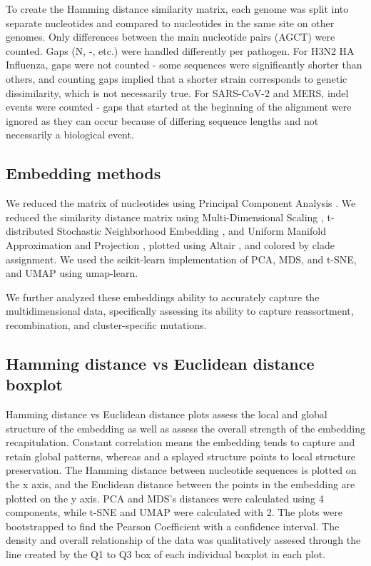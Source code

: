 \documentclass[10pt,letterpaper]{article}
\begin{document}
To create the Hamming distance similarity matrix, each genome was split into separate nucleotides and compared to nucleotides in the same site on other genomes.
Only differences between the main nucleotide pairs (AGCT) were counted.
Gaps (N, -, etc.) were handled differently per pathogen.
For H3N2 HA Influenza, gaps were not counted - some sequences were significantly shorter than others, and counting gaps implied that a shorter strain corresponds to genetic dissimilarity, which is not necessarily true.
For SARS-CoV-2 and MERS, indel events were counted - gaps that started at the beginning of the alignment were ignored as they can occur because of differing sequence lengths and not necessarily a biological event.

\subsection*{Embedding methods}
We reduced the matrix of nucleotides using Principal Component Analysis \citep{jolliffe_cadima_2016}.
We reduced the similarity distance matrix using Multi-Dimensional Scaling \citep{hout_papesh_goldinger_2012}, t-distributed Stochastic Neighborhood Embedding \citep{maaten2008visualizing}, and Uniform Manifold Approximation and Projection \citep{lel2018umap}, plotted using Altair \citep{VanderPlas2018}, and colored by clade assignment.
We used the scikit-learn implementation of PCA, MDS, and t-SNE, and UMAP using umap-learn.

We further analyzed these embeddings ability to accurately capture the multidimensional data, specifically assessing its ability to capture reassortment, recombination, and cluster-specific mutations.

\subsection*{Hamming distance vs Euclidean distance boxplot}

Hamming distance vs Euclidean distance plots assess the local and global structure of the embedding as well as assess the overall strength of the embedding recapitulation.
Constant correlation means the embedding tends to capture and retain global patterns, whereas and a splayed structure points to local structure preservation.
The Hamming distance between nucleotide sequences is plotted on the x axis, and the Euclidean distance between the points in the embedding are plotted on the y axis.
PCA and MDS's distances were calculated using 4 components, while t-SNE and UMAP were calculated with 2.
The plots were bootstrapped to find the Pearson Coefficient with a confidence interval.
The density and overall relationship of the data was qualitatively assesed through the line created by the Q1 to Q3 box of each individual boxplot in each plot.
\end{document}
